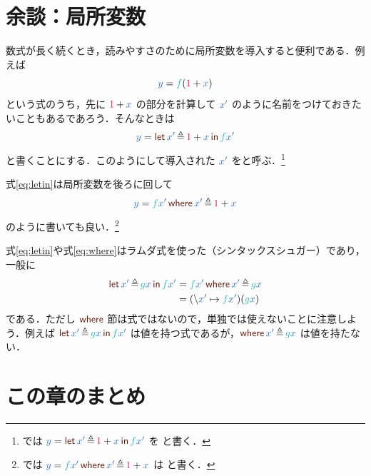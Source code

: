 \documentclass[a5paper,twoside,fleqn,draft]{jsbook}
\begin{document}
\section{余談：局所変数}

数式が長く続くとき，読みやすさのために局所変数を導入すると便利である．例えば
\begin{equation}
  \hVar{y}
  =\hFunc{f}(\hConstant{1}+\hVar{x})
\end{equation}
という式のうち，先に $\hConstant{1}+\hVar{x}$ の部分を計算して $\hVar{x'}$ のように名前をつけておきたいこともあるであろう．そんなときは
\begin{equation}
  \label{eq:letin}
  \hVar{y}
  =\hLetSyntax{\hVar{x'}\hLetEq\hConstant{1}+\hVar{x}}{\hFunc{f}\hVar{x'}}
\end{equation}
と書くことにする．このようにして導入された $\hVar{x'}$ をと呼ぶ．\footnote{\haskell では $\hVar{y}=\hLetSyntax{\hVar{x'}\hLetEq\hConstant{1}+\hVar{x}}{\hFunc{f}\hVar{x'}}$ を  と書く．}

式\eqref{eq:letin}は局所変数を後ろに回して
\begin{equation}
  \label{eq:where}
  \hVar{y}
  =\hWhereSyntax{\hFunc{f}\hVar{x'}}{\hVar{x'}\hLetEq\hConstant{1}+\hVar{x}}
\end{equation}
のように書いても良い．\footnote{\haskell では $\hVar{y}=\hWhereSyntax{\hFunc{f}\hVar{x'}}{\hVar{x'}\hLetEq\hConstant{1}+\hVar{x}}$ は  と書く．}

式\eqref{eq:letin}や式\eqref{eq:where}はラムダ式を使った（シンタックスシュガー）であり，一般に
\begin{align}
  \hLetSyntax{\hVar{x'}\hLetEq\hFunc{g}\hVar{x}}{\hFunc{f}\hVar{x'}}
  &=\hWhereSyntax{\hFunc{f}\hVar{x'}}{\hVar{x'}\hLetEq\hFunc{g}\hVar{x}}\\
  &=(\hLambdaSyntax{\hVar{x'}}{\hFunc{f}\hVar{x'}})(\hFunc{g}\hVar{x})
\end{align}
である．ただし $\hWhere$ 節は式ではないので，単独では使えないことに注意しよう．例えば $\hLetSyntax{\hVar{x'}\hLetEq\hFunc{g}\hVar{x}}{\hFunc{f}\hVar{x'}}$ は値を持つ式であるが，$\hWhereSyntax{}{\hVar{x'}\hLetEq\hFunc{g}\hVar{x}}$ は値を持たない．

\section{この章のまとめ}
\end{document}
